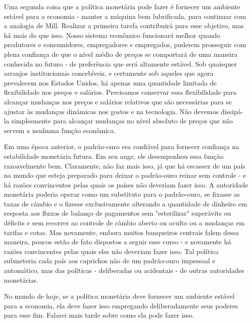 \documentclass[12pt]{article}
\begin{document}
Uma segunda coisa que a política monetária pode fazer é fornecer um ambiente estável para a economia - manter a máquina bem lubrificada, para continuar com a analogia de Mill. Realizar a primeira tarefa contribuirá para esse objetivo, mas há mais do que isso. Nosso sistema econômico funcionará melhor quando produtores e consumidores, empregadores e empregados, puderem prosseguir com plena confiança de que o nível médio de preços se comportará de uma maneira conhecida no futuro - de preferência que será altamente estável. Sob quaisquer arranjos institucionais concebíveis, e certamente sob aqueles que agora prevalecem nos Estados Unidos, há apenas uma quantidade limitada de flexibilidade nos preços e salários. Precisamos conservar essa flexibilidade para alcançar mudanças nos preços e salários relativos que são necessárias para se ajustar às mudanças dinâmicas nos gostos e na tecnologia. Não devemos dissipá-la simplesmente para alcançar mudanças no nível absoluto de preços que não servem a nenhuma função econômica.

Em uma época anterior, o padrão-ouro era confiável para fornecer confiança na estabilidade monetária futura. Em seu auge, ele desempenhou essa função razoavelmente bem. Claramente, não faz mais isso, já que há escassez de um país no mundo que esteja preparado para deixar o padrão-ouro reinar sem controle - e há razões convincentes pelas quais os países não deveriam fazer isso. A autoridade monetária poderia operar como um substituto para o padrão-ouro, se fixasse as taxas de câmbio e o fizesse exclusivamente alterando a quantidade de dinheiro em resposta aos fluxos de balanço de pagamentos sem "esterilizar" superávits ou déficits e sem recorrer ao controle de câmbio aberto ou oculto ou a mudanças em tarifas e cotas. Mas novamente, embora muitos banqueiros centrais falem dessa maneira, poucos estão de fato dispostos a seguir esse curso - e novamente há razões convincentes pelas quais eles não deveriam fazer isso. Tal política submeteria cada país aos caprichos não de um padrão-ouro impessoal e automático, mas das políticas - deliberadas ou acidentais - de outras autoridades monetárias.

No mundo de hoje, se a política monetária deve fornecer um ambiente estável para a economia, ela deve fazer isso empregando deliberadamente seus poderes para esse fim. Falarei mais tarde sobre como ela pode fazer isso.
\end{document}
